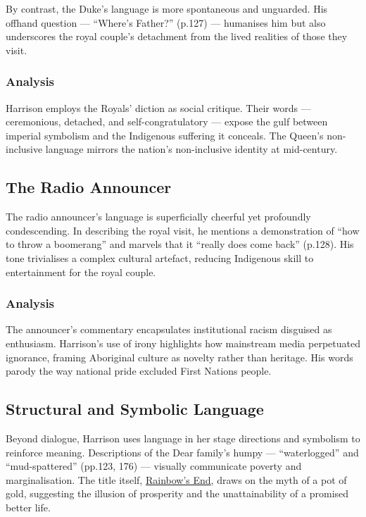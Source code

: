 \documentclass[a4paper]{article}
\begin{document}
By contrast, the Duke’s language is more spontaneous and unguarded. His offhand question — “Where’s Father?” (p.127) — humanises him but also underscores the royal couple’s detachment from the lived realities of those they visit.\\

\subsubsection{Analysis}
Harrison employs the Royals’ diction as social critique. Their words — ceremonious, detached, and self-congratulatory — expose the gulf between imperial symbolism and the Indigenous suffering it conceals. The Queen’s non-inclusive language mirrors the nation’s non-inclusive identity at mid-century.\\


\subsection{The Radio Announcer}
The radio announcer’s language is superficially cheerful yet profoundly condescending. In describing the royal visit, he mentions a demonstration of “how to throw a boomerang” and marvels that it “really does come back” (p.128). His tone trivialises a complex cultural artefact, reducing Indigenous skill to entertainment for the royal couple.\\

\subsubsection{Analysis}
The announcer’s commentary encapsulates institutional racism disguised as enthusiasm. Harrison’s use of irony highlights how mainstream media perpetuated ignorance, framing Aboriginal culture as novelty rather than heritage. His words parody the way national pride excluded First Nations people.\\


\subsection{Structural and Symbolic Language}
Beyond dialogue, Harrison uses language in her stage directions and symbolism to reinforce meaning. Descriptions of the Dear family’s humpy — “waterlogged” and “mud-spattered” (pp.123, 176) — visually communicate poverty and marginalisation. The title itself, \underline{Rainbow's End}, draws on the myth of a pot of gold, suggesting the illusion of prosperity and the unattainability of a promised better life.\\
\end{document}
